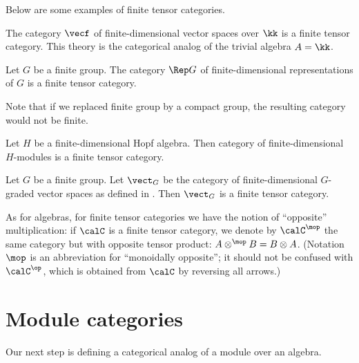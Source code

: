 Below are some examples of finite tensor categories.

\begin{example}\label{x:vecf-tensor}
  The category $\vecf$ of finite-dimensional vector spaces over $\kk$ is a
  finite tensor category. This theory is the categorical analog of the trivial
  algebra $A=\kk$.
\end{example}


\begin{example}\label{x:repg-tensor}
  Let $G$ be a finite group. The category $\Rep G$ of finite-dimensional
  representations of $G$ is a finite tensor category.
\end{example}
Note that if we replaced finite group by a compact group, the resulting category
would not be finite.

\begin{example}\label{x:hopf-tensor}
  Let $H$ be a finite-dimensional Hopf algebra. Then category of
  finite-dimensional $H$-modules is a finite tensor category.
\end{example}

\begin{example}\label{x:vectg-tensor}
  Let $G$ be a finite group. Let $\vect_G$ be the category of finite-dimensional
  $G$-graded vector spaces as defined in .
  Then $\vect_G$ is a finite tensor category.
\end{example}

As for algebras, for finite tensor categories we have the notion of ``opposite''
multiplication: if $\calC$ is a finite tensor category, we denote by
$\calC^\mop$ the same category but with opposite tensor product:
$A\otimes^{\mop} B=B \otimes A$. (Notation $\mop$ is an abbreviation for
``monoidally opposite''; it should not be confused with $\calC^\op$, which is
obtained from $\calC$ by reversing all arrows.)


\section{Module categories}\label{s:module-categories}
Our next step is defining a categorical analog of a module over an algebra.

